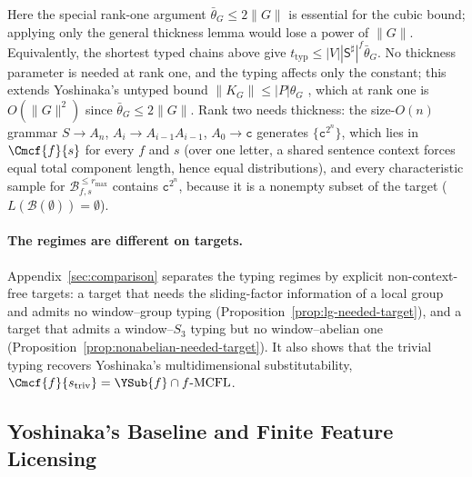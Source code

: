 Here the special rank-one argument $\bar\theta_G\le2\|G\|$ is
essential for the cubic bound; applying only the general thickness lemma
would lose a power of $\|G\|$.  Equivalently, the shortest typed chains
above give $t_{\mathrm{typ}}\le |V||\mathsf S^\sharp|^f\bar\theta_G$.
No thickness parameter is needed at rank one, and the typing affects only the
constant; this extends Yoshinaka's untyped bound $\|K_G\|\le|P|\theta_G$
\cite[Lemma~7]{Yoshinaka2011}, which at rank one is $O(\|G\|^2)$ since
$\bar\theta_G\le2\|G\|$.  Rank two needs thickness: the size-$O(n)$
grammar $S\to A_n$, $A_i\to A_{i-1}A_{i-1}$, $A_0\to\mathtt c$ generates
$\{\mathtt c^{2^n}\}$, which lies in $\Cmcf{f}{s}$ for every $f$ and $s$ (over one
letter, a shared sentence context forces equal total component length, hence equal
distributions), and every characteristic sample for $\mathcal B^{\le r_{\max}}_{f,s}$
contains $\mathtt c^{2^n}$, because it is a nonempty subset of the target
($L(\mathcal B(\emptyset))=\emptyset$).

\paragraph{The regimes are different on targets.}
Appendix~\ref{sec:comparison} separates the typing regimes by explicit
non-context-free targets: a target that needs the sliding-factor information of
a local group and admits no window--group typing
(Proposition~\ref{prop:lg-needed-target}), and a target that admits a
window--$S_3$ typing but no window--abelian one
(Proposition~\ref{prop:nonabelian-needed-target}).  It also shows that the trivial
typing recovers Yoshinaka's multidimensional substitutability,
$\Cmcf{f}{s_{\mathrm{triv}}}=\YSub{f}\cap f\text{-}\mathrm{MCFL}$.

\subsection{Yoshinaka's Baseline and Finite Feature Licensing}
\label{subsec:baseline}
